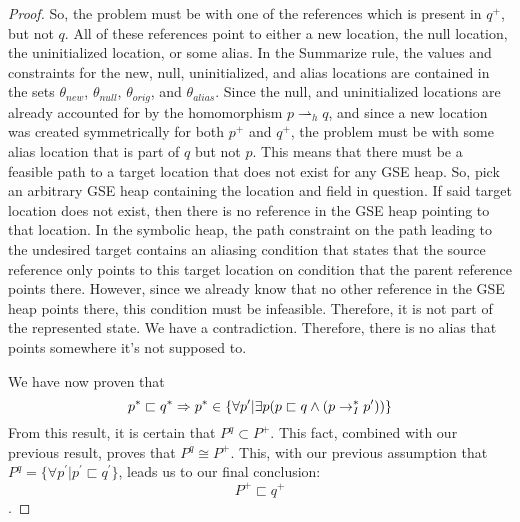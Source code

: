 \begin{proof}
So, the problem must be with one of the references which is present in $q^+$, but not $q$. All of these references point to either a new location, the null location, the uninitialized location, or some alias. In the Summarize rule, the values and constraints for the new, null, uninitialized, and alias locations are contained in the sets $\theta_{new}$, $\theta_{null}$, $\theta_\mathit{orig}$, and $\theta_{alias}$. Since the null, and uninitialized locations are already accounted for by the homomorphism $p \rightharpoonup_h {q}$, and since a new location was created symmetrically for both $p^+$ and $q^+$, the problem must be with some alias location that is part of ${q}$ but not $p$. This means that there must be a feasible path to a target location that does not exist for any GSE heap. So, pick an arbitrary GSE heap containing the location and field in question. If said target location does not exist, then there is no reference in the GSE heap pointing to that location. In the symbolic heap, the path constraint on the path leading to the undesired target contains an aliasing condition that states that the source reference only points to this target location on condition that the parent reference points there. However, since we already know that no other reference in the GSE heap points there, this condition must be infeasible. Therefore, it is not part of the represented state. We have a contradiction. Therefore, there is no alias that points somewhere it's not supposed to.

We have now proven that 
$$ {p}^* \sqsubset {q}^*  \Rightarrow  {p}^* \in \{\forall {p}^\prime | \exists {p} ({p} \sqsubset {q} \wedge ({p} \rightarrow_I^* {p}^\prime) ) \}$$
From this result, it is certain that $P^q \subset P^+$. This fact, combined with our previous result, proves that $P^q \cong P^+$. This, with our previous assumption that $P^{q} = \{\forall {p}^\prime | {p}^\prime \sqsubset {q}^\prime \}$, leads us to our final conclusion:
$$ P^+ \sqsubset q^+$$.

\end{proof}

\begin{comment}
Choose any P and Q such that P is represented by Q on field access. Choose some P' that P transitions too.
Pick some p' in P'. By definition, it is related to a p in P. Use that p. Show how that p is related to p'. Then relate to q'.

Arbitrary P' such that P transitions to P'. Reason over each possible P' (how every many choices might exist--Only one for FA). Pick arbitrary p' in one of the successor. Do the forward proof. Show connection in q'. Connect to P' since it holds for arbitrary. 

Repeat process for each possible successor P'

For backward, for each q', there must exists a p'. All we need is one p and then that implies there exists a P. Must do for all Q'. 
\end{comment}

